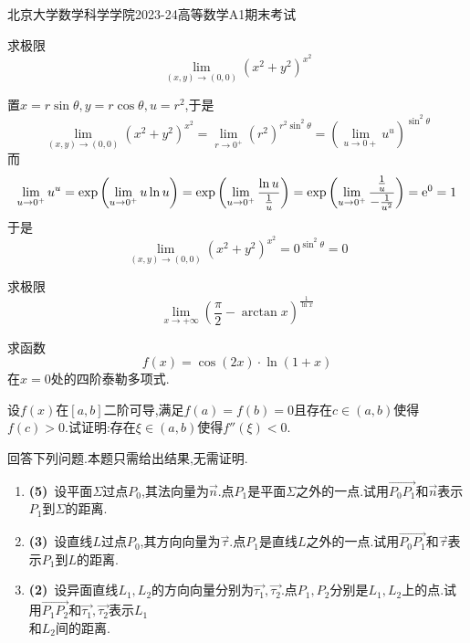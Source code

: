 \documentclass{ctexart}
\begin{document}
\pagestyle{empty}
\begin{center}\Large
    北京大学数学科学学院2023-24高等数学A1期末考试
\end{center}
\begin{problem}[1.(11\songti{分})]
    求极限\[\lim_{(x,y)\to(0,0)}\left(x^2+y^2\right)^{x^2}\]
\end{problem}
\begin{solution}
    置$x=r\sin\theta,y=r\cos\theta,u=r^2$,于是
    \[\lim_{(x,y)\to(0,0)}\left(x^2+y^2\right)^{x^2}=\lim_{r\to0^+}\left(r^2\right)^{r^2\sin^2\theta}=\left(\lim_{u\to0+}u^u\right)^{\sin^2\theta}\]
    而
    \[\lim_{u\to0^+}u^u=\text{exp}\left(\lim_{u\to0^+}u\ln u\right)=\text{exp}\left(\lim_{u\to0^+}\dfrac{\ln u}{\frac{1}{u}}\right)=\text{exp}\left(\lim_{u\to0^+}\dfrac{\frac{1}{u}}{-\frac{1}{u^2}}\right)=\mathrm{e}^0=1\]
    于是
    \[\lim_{(x,y)\to(0,0)}\left(x^2+y^2\right)^{x^2}=0^{\sin^2\theta}=0\]
\end{solution}
\begin{problem}[2.(11\songti{分})]
    求极限\[\lim_{x\to+\infty}\left(\dfrac{\pi}{2}-\arctan x\right)^{\frac{1}{\ln x}}\]
\end{problem}
\begin{problem}[3.(11\songti{分})]
    求函数\[f(x)=\cos(2x)\cdot\ln(1+x)\]在$x=0$处的四阶泰勒多项式.
\end{problem}
\begin{problem}[4.(12\songti{分})]
    设$f(x)$在$[a,b]$二阶可导,满足$f(a)=f(b)=0$且存在$c\in(a,b)$使得$f(c)>0$.试证明:存在$\xi\in(a,b)$使得$f''(\xi)<0$.
\end{problem}
\begin{problem}[5.(10\songti{分})]
    回答下列问题.本题只需给出结果,无需证明.
    \begin{enumerate}[label=\tbf{(\arabic*)}]
        \item \textbf{(5)}\ 设平面$\Sigma$过点$P_0$,其法向量为$\vec{n}$.点$P_1$是平面$\Sigma$之外的一点.试用$\overrightarrow{P_0P_1}$和$\vec{n}$表示$P_1$到$\Sigma$的距离.
        \item \textbf{(3)}\ 设直线$L$过点$P_0$,其方向向量为$\vec{\tau}$.点$P_1$是直线$L$之外的一点.试用$\overrightarrow{P_0P_1}$和$\vec{\tau}$表示$P_1$到$L$的距离.
        \item \textbf{(2)}\ 设异面直线$L_1,L_2$的方向向量分别为$\vec{\tau_1},\vec{\tau_2}$.点$P_1,P_2$分别是$L_1,L_2$上的点.试用$\overrightarrow{P_1P_2}$和$\vec{\tau_1},\vec{\tau_2}$表示$L_1$\\和$L_2$间的距离.
    \end{enumerate}
\end{problem}
\end{document}
